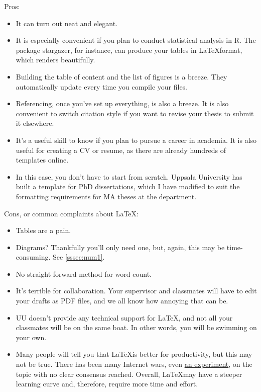\documentclass[12pt, letterpaper]{article}
\begin{document}
Pros:
\begin{itemize}[noitemsep]
	\item{It can turn out neat and elegant.}
	\item{It is especially convenient if you plan to conduct statistical analysis in \textsf{R}. The package stargazer, for instance, can produce your tables in \LaTeX format, which renders beautifully.}
	\item{Building the table of content and the list of figures is a breeze. They automatically update every time you compile your files.}
	\item{Referencing, once you've set up everything, is also a breeze. It is also convenient to switch citation style if you want to revise your thesis to submit it elsewhere.}
	\item{It's a useful skill to know if you plan to pursue a career in academia. It is also useful for creating a CV or resume, as there are already hundreds of templates online.}
	\item{In this case, you don't have to start from scratch. Uppsala University has built a template for PhD dissertations, which I have modified to suit the formatting requirements for MA theses at the department.}
\end{itemize}
	
Cons, or common complaints about \LaTeX:

\begin{itemize}[noitemsep]
	\item{Tables are a pain.}
	\item{Diagrams? Thankfully you'll only need one, but, again, this may be time-consuming. See \ref{sssec:num1}.}
	\item{No straight-forward method for word count.}
	\item{It's terrible for collaboration. Your supervisor and classmates will have to edit your drafts as PDF files, and we all know how annoying that can be.} 
	\item{UU doesn't provide any technical support for \LaTeX, and not all your classmates will be on the same boat. In other words, you will be swimming on your own.}
	\item{Many people will tell you that \LaTeX is better for productivity, but this may not be true. There has been many Internet wars, even \href{https://journals.plos.org/plosone/article?id=10.1371/journal.pone.0115069}{an experiment}, on the topic with no clear consensus reached. Overall, \LaTeX may have a steeper learning curve and, therefore, require more time and effort.} 
\end{itemize}
	
\end{document}

